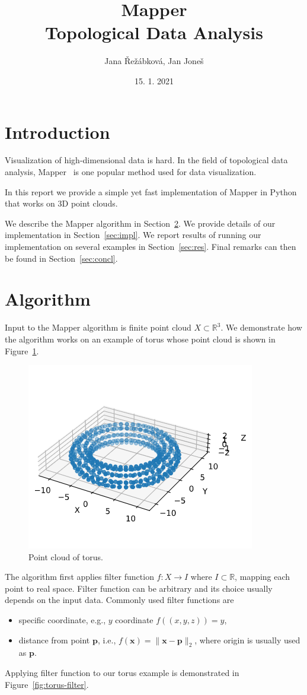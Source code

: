 \documentclass{article}
\title{Mapper \\ \vspace{0.2cm} \large Topological Data Analysis}
\author{Jana Řežábková, Jan Joneš}
\date{15. 1. 2021}
\begin{document}
\maketitle

\section{Introduction}

Visualization of high-dimensional data is hard.
In the field of topological data analysis, Mapper~\cite{mapper} is one popular method used for data visualization.

In this report we provide a simple yet fast implementation of Mapper in Python that works on 3D point clouds.

We describe the Mapper algorithm in Section~\ref{sec:alg}.
We provide details of our implementation in Section~\ref{sec:impl}.
We report results of running our implementation on several examples in Section~\ref{sec:res}.
Final remarks can then be found in Section~\ref{sec:concl}.

\section{Algorithm}\label{sec:alg}

Input to the Mapper algorithm is finite point cloud $X \subset \mathbb{R}^3$.
We demonstrate how the algorithm works on an example of torus whose point cloud is shown in Figure~\ref{fig:torus-points}.

\begin{figure}[ht]
    \centering
    \includegraphics[width=0.5\columnwidth]{torus-point-cloud}
    \caption{Point cloud of torus.}
    \label{fig:torus-points}
\end{figure}

The algorithm first applies filter function $f: X \to I$ where $I \subset \mathbb{R}$, mapping each point to real space.
Filter function can be arbitrary and its choice usually depends on the input data.
Commonly used filter functions are
\begin{itemize}
    \item specific coordinate, e.g., $y$ coordinate $f((x, y, z)) = y$,
    \item distance from point $\mathbf{p}$, i.e., $f(\mathbf{x}) = \lVert \mathbf{x} - \mathbf{p} \rVert_2$, where origin is usually used as $\mathbf{p}$.
\end{itemize}
Applying filter function to our torus example is demonstrated in Figure~\ref{fig:torus-filter}.
\end{document}
